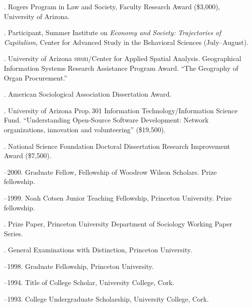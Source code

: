 \documentclass[11pt]{article}
\begin{document}
. Rogers Program in Law and Society, Faculty Research Award
(\$3,000), University of Arizona.

. Participant, Summer Institute on \emph{Economy and Society: Trajectories of Capitalism}, Center for Advanced Study in the Behavioral Sciences (July--August).

. University of Arizona \textsc{sbsri}/Center for Applied Spatial
Analysis. Geographical Information Systems Research Assistance
Program Award. ``The Geography of Organ Procurement.''

. American Sociological Association Dissertation Award.

. University of Arizona Prop.\,301 Information Technology/Information Science Fund. ``Understanding Open-Source Software Development: Network organizations, innovation and volunteering'' (\$19,500).

. National Science Foundation Doctoral Dissertation Research Improvement Award (\$7,500).

--2000. Graduate Fellow, Fellowship of Woodrow Wilson Scholars. Prize fellowship.

--1999. Noah Cotsen Junior Teaching Fellowship, Princeton University. Prize fellowship.

. Prize Paper, Princeton University Department of Sociology Working Paper Series.

. General Examinations with Distinction, Princeton University.

--1998. Graduate Fellowship, Princeton University.

--1994. Title of College Scholar, University College, Cork.

--1993. College Undergraduate Scholarship, University
College, Cork.







\bigskip 

\newpage
\end{document}
